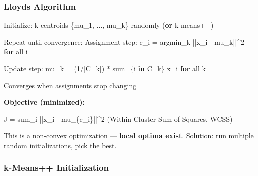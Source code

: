 \documentclass[11pt]{article}
\newenvironment{Shaded}{\begin{snugshade}}{\end{snugshade}}
\newcommand{\BuiltInTok}[1]{\textcolor[rgb]{0.50,0.55,0.55}{#1}}
\newcommand{\ControlFlowTok}[1]{\textcolor[rgb]{0.99,0.74,0.29}{\textbf{#1}}}
\newcommand{\DecValTok}[1]{\textcolor[rgb]{0.96,0.45,0.00}{#1}}
\newcommand{\KeywordTok}[1]{\textcolor[rgb]{0.81,0.81,0.76}{\textbf{#1}}}
\newcommand{\NormalTok}[1]{\textcolor[rgb]{0.81,0.81,0.76}{#1}}
\newcommand{\OperatorTok}[1]{\textcolor[rgb]{0.81,0.81,0.76}{#1}}
\begin{document}
\subsubsection{Lloyd\textquotesingle s Algorithm}\label{lloyds-algorithm}


\begin{Shaded}
\begin{Highlighting}[]
\NormalTok{Initialize: k centroids \{mu\_1, ..., mu\_k\} randomly (}\KeywordTok{or}\NormalTok{ k}\OperatorTok{{-}}\NormalTok{means}\OperatorTok{++}\NormalTok{)}

\NormalTok{Repeat until convergence:}
\NormalTok{    Assignment step:}
\NormalTok{        c\_i }\OperatorTok{=}\NormalTok{ argmin\_k }\OperatorTok{||}\NormalTok{x\_i }\OperatorTok{{-}}\NormalTok{ mu\_k}\OperatorTok{||\^{}}\DecValTok{2}    \ControlFlowTok{for} \BuiltInTok{all}\NormalTok{ i}
    
\NormalTok{    Update step:}
\NormalTok{        mu\_k }\OperatorTok{=}\NormalTok{ (}\DecValTok{1}\OperatorTok{/|}\NormalTok{C\_k}\OperatorTok{|}\NormalTok{) }\OperatorTok{*}\NormalTok{ sum\_\{i }\KeywordTok{in}\NormalTok{ C\_k\} x\_i    }\ControlFlowTok{for} \BuiltInTok{all}\NormalTok{ k}

\NormalTok{Converges when assignments stop changing}
\end{Highlighting}
\end{Shaded}

\textbf{Objective (minimized):}


\begin{Shaded}
\begin{Highlighting}[]
\NormalTok{J }\OperatorTok{=}\NormalTok{ sum\_i }\OperatorTok{||}\NormalTok{x\_i }\OperatorTok{{-}}\NormalTok{ mu\_\{c\_i\}}\OperatorTok{||\^{}}\DecValTok{2}\NormalTok{    (Within}\OperatorTok{{-}}\NormalTok{Cluster Sum of Squares, WCSS)}
\end{Highlighting}
\end{Shaded}

This is a non-convex optimization --- \textbf{local optima exist}. Solution: run multiple random initializations, pick the best.

\subsubsection{k-Means++ Initialization}\label{k-means-initialization}
\end{document}
